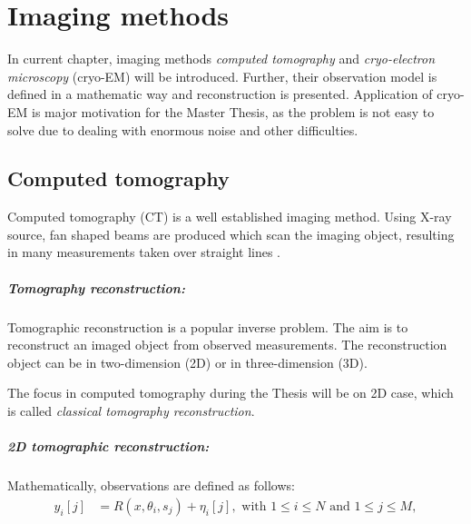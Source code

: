 \chapter{Imaging methods}
\label{sec:imaging}

In current chapter, imaging methods \textit{computed tomography} and 
\textit{cryo-electron microscopy} (cryo-EM) will be introduced. 
Further, their observation model is defined in a mathematic way and reconstruction is presented.
Application of cryo-EM is major motivation for the Master Thesis, 
as the problem is not easy to solve due to dealing with enormous noise and other difficulties.


\section{Computed tomography}
Computed tomography (CT) is a well established imaging method.
Using X-ray source, fan shaped beams are produced which scan the imaging object,
resulting in many measurements taken over straight lines \cite{computedTomography}.

\paragraph{Tomography reconstruction:}
Tomographic reconstruction \cite{tomographicReconstruction} is a popular inverse problem. 
The aim is to reconstruct an imaged object from observed measurements.
The reconstruction object can be in two-dimension (2D) or in three-dimension (3D). 

\begin{tcolorbox}[colback=red!5!white,colframe=red!75!black]
    The focus in computed tomography during the Thesis will be on 2D case, which is called \textit{classical tomography reconstruction}.
\end{tcolorbox}

\paragraph{2D tomographic reconstruction:}

Mathematically, observations are defined as follows:
\begin{equation}
    \label{eq:2Dreconstruction}
    \begin{aligned}
        y_i[j] &= R(x, \theta_i, s_j) + \eta_i[j] , \text{ with } 1 \leq i \leq N \text{ and } 1 \leq j \leq M,
    \end{aligned}
\end{equation}

